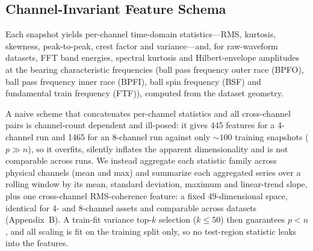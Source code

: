 \documentclass[IJPHM, 2026, 0]{PHMSociety}
\begin{document}
\subsection{Channel-Invariant Feature Schema}
Each snapshot yields per-channel time-domain statistics---RMS, kurtosis, skewness, peak-to-peak, crest factor and variance---and, for raw-waveform datasets, FFT band energies, spectral kurtosis \cite{antoni2006spectral} and Hilbert-envelope amplitudes at the bearing characteristic frequencies (ball pass frequency outer race (BPFO), ball pass frequency inner race (BPFI), ball spin frequency (BSF) and fundamental train frequency (FTF)), computed from the dataset geometry.

A naive scheme that concatenates per-channel statistics and all cross-channel pairs is channel-count dependent and ill-posed: it gives 445 features for a 4-channel run and 1465 for an 8-channel run against only ${\sim}100$ training snapshots ($p \gg n$), so it overfits, silently inflates the apparent dimensionality and is not comparable across runs. We instead aggregate each statistic family across physical channels (mean and max) and summarize each aggregated series over a rolling window by its mean, standard deviation, maximum and linear-trend slope, plus one cross-channel RMS-coherence feature: a fixed 49-dimensional space, identical for 4- and 8-channel assets and comparable across datasets (Appendix~B). A train-fit variance top-$k$ selection ($k \le 50$) then guarantees $p < n$, and all scaling is fit on the training split only, so no test-region statistic leaks into the features.
\end{document}
